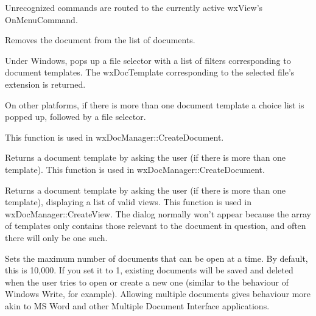 Unrecognized commands are routed to the currently active wxView's OnMenuCommand.



Removes the document from the list of documents.



Under Windows, pops up a file selector with a list of filters corresponding to document templates.
The wxDocTemplate corresponding to the selected file's extension is returned.

On other platforms, if there is more than one document template a choice list is popped up,
followed by a file selector.

This function is used in wxDocManager::CreateDocument.



Returns a document template by asking the user (if there is more than one template).
This function is used in wxDocManager::CreateDocument.



Returns a document template by asking the user (if there is more than one template),
displaying a list of valid views. This function is used in wxDocManager::CreateView.
The dialog normally won't appear because the array of templates only contains
those relevant to the document in question, and often there will only be one such.



Sets the maximum number of documents that can be open at a time. By default, this
is 10,000. If you set it to 1, existing documents will be saved and deleted
when the user tries to open or create a new one (similar to the behaviour
of Windows Write, for example). Allowing multiple documents gives behaviour
more akin to MS Word and other Multiple Document Interface applications.



